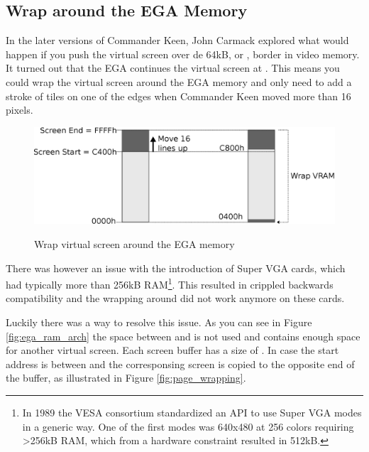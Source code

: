 \documentclass[book.tex]{subfiles}
\begin{document}
\subsection{Wrap around the EGA Memory}
In the later versions of Commander Keen, John Carmack explored what would happen if you push the virtual screen over de 64kB, or , border in video memory. It turned out that the EGA continues the virtual screen at . This means you could wrap the virtual screen around  the EGA memory and only need to add a stroke of tiles on one of the edges when Commander Keen moved more than 16 pixels.
\\
\begin{figure}[H]
  \centering
  \includegraphics[width=\textwidth]{imgs/drawings/ega_wrapping.eps}
  \label{fig:ega_wrapping}
  \caption{Wrap virtual screen around the EGA memory}
\end{figure}
\par
There was however an issue with the introduction of Super VGA cards, which had typically more than 256kB RAM\footnote{In 1989 the VESA consortium standardized an API to use Super VGA modes in a generic way. One of the first modes was 640x480 at 256 colors requiring >256kB RAM, which from a hardware constraint resulted in 512kB.}. This resulted in crippled backwards compatibility and the wrapping around  did not work anymore on these cards. \\
\par
Luckily there was a way to resolve this issue. As you can see in Figure \ref{fig:ega_ram_arch} the space between  and  is not used and contains enough space for another virtual screen. Each screen buffer has a size of . In case the start address is between  and  the corresponsing screen is copied to the opposite end of the buffer, as illustrated in Figure \ref{fig:page_wrapping}.
\end{document}
